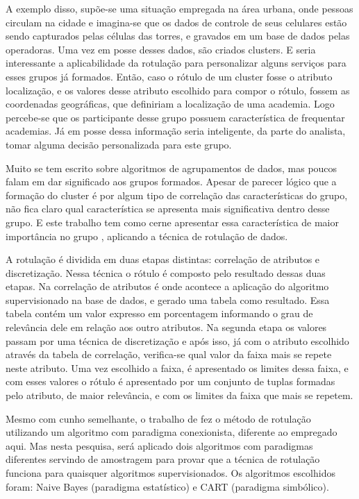A exemplo disso, supõe-se uma situação empregada na área urbana, onde pessoas circulam na cidade e imagina-se que os dados de controle de seus celulares estão sendo capturados pelas células das torres, e gravados em um base de dados pelas operadoras. Uma vez em posse desses dados, são criados clusters. E seria interessante a aplicabilidade da rotulação para personalizar alguns serviços para esses grupos já formados. Então, caso o rótulo de um cluster fosse o atributo localização, e os valores  desse atributo escolhido para compor o rótulo, fossem as coordenadas geográficas, que definiriam a localização de uma academia. Logo percebe-se que os participante desse grupo possuem característica de frequentar academias. Já em posse dessa informação  seria inteligente, da parte do analista, tomar alguma decisão personalizada para este grupo.

Muito se tem escrito sobre algoritmos de agrupamentos de dados, mas poucos falam em dar significado aos grupos formados. Apesar de parecer  lógico que a formação do cluster é por algum tipo de correlação das características do grupo, não fica claro qual característica se apresenta mais significativa dentro desse grupo. E este trabalho tem como cerne apresentar essa característica de maior importância no grupo , aplicando a técnica de rotulação de dados.

A rotulação é dividida em duas etapas distintas: correlação de atributos e discretização. Nessa técnica o rótulo é composto pelo resultado dessas duas etapas. Na correlação de atributos é onde acontece a aplicação do algoritmo supervisionado na base de dados, e gerado uma tabela como resultado. Essa tabela contém um valor expresso em porcentagem informando o grau de relevância dele em relação aos outro atributos. Na segunda etapa os valores passam por uma técnica de discretização e após isso, já com o atributo escolhido através da tabela de correlação, verifica-se qual valor da faixa mais se repete neste atributo. Uma vez escolhido a faixa, é apresentado os limites dessa faixa, e com esses valores o rótulo é apresentado por um conjunto de tuplas formadas pelo atributo, de maior relevância, e com os limites da faixa que mais se repetem. 

Mesmo com cunho semelhante, o trabalho de \cite{Lopes} fez o método de rotulação utilizando um algoritmo com paradigma conexionista, diferente ao empregado aqui. Mas nesta pesquisa, será aplicado dois algoritmos com paradigmas diferentes servindo de amostragem para provar que a técnica de rotulação funciona para quaisquer algoritmos supervisionados. Os algoritmos escolhidos foram: Naive Bayes (paradigma estatístico) e CART (paradigma simbólico).

